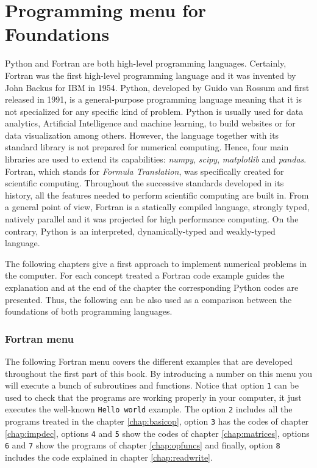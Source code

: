 
\chapter*{Programming menu for Foundations}
\vspace{-2.5cm}
Python and Fortran are both high-level programming languages. 
Certainly, Fortran was the first high-level programming language and it was invented by John Backus for IBM in 1954.
Python, developed by Guido van Rossum and first released in 1991, is a general-purpose programming language
meaning that it is not specialized for any specific kind of problem.
Python is usually used for data analytics, Artificial Intelligence and machine learning, to build websites or for data visualization among others. 
However, the language together with its standard library is not prepared for numerical computing.
Hence, four main libraries are used to extend its capabilities: \textit{numpy}, \textit{scipy}, \textit{matplotlib} and \textit{pandas}. 
Fortran, which stands for \textit{Formula Translation}, was specifically created for scientific computing.
Throughout the successive standards developed in its history, all the features needed to perform scientific computing are built in. 
From a general point of view, Fortran is a statically compiled language, strongly typed, natively parallel and it was projected for high performance computing.
On the contrary, Python is an interpreted, dynamically-typed and weakly-typed language.

The following chapters give a first approach to implement numerical 
problems in the computer.
For each concept treated a Fortran code example guides the explanation and at the 
end of the chapter the corresponding Python codes are presented. Thus, the following
can be also used as a comparison between the foundations of both programming languages.  


    \vspace{-0.3cm}
    \subsection*{Fortran menu}
    \vspace{-0.3cm}
The following Fortran menu covers the different examples that are developed throughout the first part of this book.
By introducing a number on this menu you will execute a bunch of subroutines and functions. 
Notice that option \texttt{1} can be used to check that the programs are working properly in your computer, it just executes the well-known \texttt{Hello world} example. 
The option \texttt{2} includes all the programs treated in the chapter \ref{chap:basicop}, 
option \texttt{3} has the codes of chapter \ref{chap:impdec},
options \texttt{4} and \texttt{5} show the codes of chapter \ref{chap:matrices},
options \texttt{6} and \texttt{7} show the programs of chapter \ref{chap:opfuncs} and finally,
option \texttt{8} includes the code explained in chapter \ref{chap:readwrite}.

